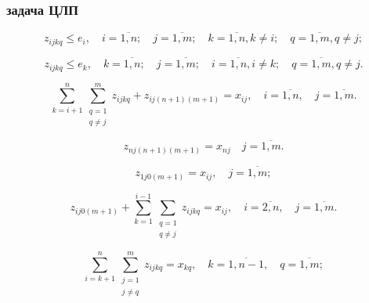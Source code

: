 \begin{frame}
    \frametitle{задача ЦЛП}
    
    \begin{minipage}[t]{0.99\linewidth}
        \fontsize{8 pt}{7.2}\selectfont
        \begin{equation}
            \label{eq:part3_z_ijkq_1}
            z_{ijkq} \leq e_i , \quad i = \overline{1, n}; \quad j = \overline{1, m}; \quad k = \overline{1,n}, k \neq i; \quad q = \overline{1,m}, q \neq j;
        \end{equation}
        
        
        \begin{equation}
            \label{eq:part3_z_ijkq_2}
            z_{ijkq} \leq e_k , \quad k = \overline{1, n}; \quad j = \overline{1, m}; \quad i = \overline{1,n}, i \neq k; \quad q = \overline{1,m}, q \neq j.
        \end{equation}
        
        
        \begin{equation}
            \label{eq:part3_z_ijkq_3_1}
            \sum\limits_{k=i+1}^{n} \sum\limits_{\substack{q = 1\\ q \neq j}}^m z_{ijkq} + z_{ij(n+1)(m+1)} = x_{ij} ,  \quad i = \overline{1, n}, \quad j = \overline{1, m}.
        \end{equation}

        
        \begin{equation}
            \label{eq:part3_z_ijkq_3_2}
            z_{nj(n+1)(m+1)} = x_{nj} \quad j = \overline{1, m}.
        \end{equation}

        
        \begin{equation}
            \label{eq:part3_z_ijkq_4_1}
            z_{1j0(m+1)}= x_{ij}, \quad j = \overline{1, m};
        \end{equation}

        
        \begin{equation}
            \label{eq:part3_z_ijkq_4_2}
            z_{ij0(m+1)} + \sum\limits_{k=1}^{i-1} \sum\limits_{\substack{q = 1\\ q \neq j}} z_{ijkq}= x_{ij}, \quad i = \overline{2, n}, \quad j = \overline{1, m}.
        \end{equation}

        
        \begin{equation}
            \label{eq:part3_z_ijkq_5}
            \sum\limits_{i=k+1}^{n} \sum\limits_{\substack{j=1 \\ j \neq q}}^m z_{ijkq} = x_{kq} , \quad k = \overline{1, n-1}, \quad q = \overline{1, m};
        \end{equation}


\end{minipage}
\end{frame}
